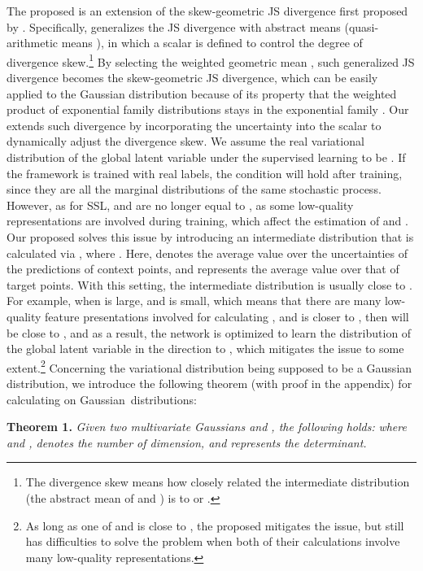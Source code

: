 \documentclass[nohyperref]{article}
\theoremstyle{plain}
\theoremstyle{definition}
\theoremstyle{remark}
\begin{document}
The proposed  is an extension of the skew-geo\-met\-ric JS diver\-gence first proposed by \citet{nielsen2020generalization}. Specifically, \citet{nielsen2020generalization} generalizes the JS divergence with abstract means (quasi-arithmetic means \cite{niculescu2006convex}), in which a scalar  is defined to control the degree of divergence skew.\footnote{The divergence skew means how closely related the intermediate distribution (the abstract mean of  and ) is to  or .} By selecting the weighted geometric mean ,  such generalized JS divergence becomes the skew-geometric JS divergence, which can be easily applied to the Gaussian distribution because of its property that the weighted product of exponential family distributions stays in the exponential family \cite{nielsen2009statistical}.  
Our  extends such divergence by incorporating the uncertainty into the scalar  to dynamically adjust the divergence skew. We assume the real variational distribution of the global latent variable under the supervised learning to be . If the framework is trained with real labels, the condition  will hold after training, since they are all the marginal distributions of the same stochastic process. 
However, as for SSL,  and  are no longer equal to , as some low-quality representations are involved during training, which affect the estimation of  and . Our proposed  solves this issue by introducing an intermediate distribution that is  calculated via  , where .   Here,   denotes the average value over the uncertainties of the predictions of context points, and  represents the average value over that of target points. With this setting, the intermediate distribution is usually close to  . For example, when  is large, and  is small, which means that there are many low-quality feature presentations  involved for calculating , and  is closer to , then  will be close to , and as a result, the network is optimized to learn the distribution of the global latent variable in the direction to , which mitigates the issue to some extent.\footnote{As long as one of  and   is close to , the proposed  mitigates the issue, but  still has difficulties to solve the problem when both of their calculations involve many low-quality representations.}  Concerning  the variational distribution being  supposed to be a Gaussian distribution, we introduce the following theorem (with proof in the appendix) for calculating  on Gaussian~distributions:

\smallskip
{\bf Theorem 1.} \emph{Given two multivariate Gaussians  and , the following holds:}    
\emph{where  and ,   denotes the number of dimension, and  represents the determinant.}
\smallskip
\end{document}
